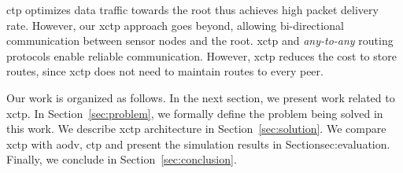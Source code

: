 \ac{ctp} optimizes data traffic towards the root thus achieves high
packet delivery rate. However, our \ac{xctp} approach goes beyond,
allowing bi-directional communication between sensor nodes and the
root. \ac{xctp} and \textit{any-to-any} routing protocols enable
reliable communication. However, \ac{xctp} reduces the cost to store
routes, since \ac{xctp} does not need to maintain routes to every
peer.

Our work is organized as follows. In the next section, we present
work related to \ac{xctp}. In Section~\ref{sec:problem}, we formally
define the problem being solved in this work. We describe \ac{xctp}
architecture in Section~\ref{sec:solution}. We compare \ac{xctp}
with \ac{aodv}, \ac{ctp} and present the simulation results in
Section{sec:evaluation}. Finally, we conclude in
Section~\ref{sec:conclusion}.
